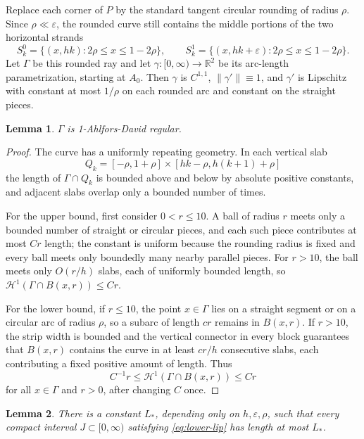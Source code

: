 \documentclass[11pt]{article}
\newtheorem{lemma}{Lemma}
\newcommand{\HH}{\mathcal H}
\newcommand{\R}{\mathbb R}
\begin{document}
Replace each corner of \(P\) by the standard tangent circular rounding of
radius \(\rho\).  Since \(\rho\ll\varepsilon\), the rounded curve still contains
the middle portions of the two horizontal strands
\[
  S_k^0=\{(x,hk): 2\rho\le x\le 1-2\rho\},\qquad
  S_k^1=\{(x,hk+\varepsilon): 2\rho\le x\le 1-2\rho\}.
\]
Let \(\Gamma\) be this rounded ray and let \(\gamma:[0,\infty)\to\R^2\) be its
arc-length parametrization, starting at \(A_0\).  Then \(\gamma\) is
\(C^{1,1}\), \(\|\gamma'\|\equiv1\), and \(\gamma'\) is Lipschitz with constant
at most \(1/\rho\) on each rounded arc and constant on the straight pieces.

\begin{lemma}
\label{lem:regular}
\(\Gamma\) is 1-Ahlfors-David regular.
\end{lemma}

\begin{proof}
The curve has a uniformly repeating geometry.  In each vertical slab
\[
  Q_k=[-\rho,1+\rho]\times[hk-\rho,h(k+1)+\rho]
\]
the length of \(\Gamma\cap Q_k\) is bounded above and below by absolute
positive constants, and adjacent slabs overlap only a bounded number of times.

For the upper bound, first consider \(0<r\le 10\).  A ball of radius \(r\)
meets only a bounded number of straight or circular pieces, and each such
piece contributes at most \(C r\) length; the constant is uniform because the
rounding radius is fixed and every ball meets only boundedly many nearby
parallel pieces.  For \(r>10\), the ball meets only \(O(r/h)\) slabs, each of
uniformly bounded length, so \(\HH^1(\Gamma\cap B(x,r))\le C r\).

For the lower bound, if \(r\le 10\), the point \(x\in\Gamma\) lies on a
straight segment or on a circular arc of radius \(\rho\), so a subarc of length
\(c r\) remains in \(B(x,r)\).  If \(r>10\), the strip width is bounded and the
vertical connector in every block guarantees that \(B(x,r)\) contains the
curve in at least \(c r/h\) consecutive slabs, each contributing a fixed
positive amount of length.  Thus
\[
  C^{-1}r\le \HH^1(\Gamma\cap B(x,r))\le C r
\]
for all \(x\in\Gamma\) and \(r>0\), after changing \(C\) once.
\end{proof}

\begin{lemma}
\label{lem:admissible-bounded}
There is a constant \(L_*\), depending only on \(h,\varepsilon,\rho\), such
that every compact interval \(J\subset[0,\infty)\) satisfying
\eqref{eq:lower-lip} has length at most \(L_*\).
\end{lemma}
\end{document}
